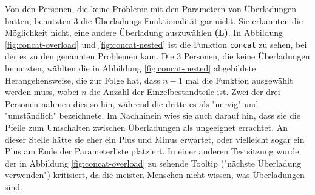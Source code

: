 Von den Personen, die keine Probleme mit den Parametern von Überladungen hatten, benutzten 3 die Überladungs-Funktionalität gar nicht. Sie erkannten die Möglichkeit nicht, eine andere Überladung auszuwählen \textbf{(L)}. In Abbildung \ref{fig:concat-overload} und \ref{fig:concat-nested} ist die Funktion \texttt{concat} zu sehen, bei der es zu den genannten Problemen kam. Die 3 Personen, die keine Überladungen benutzten, wählten die in Abbildung \ref{fig:concat-nested} abgebildete Herangehensweise, die zur Folge hat, dass $n-1$ mal die Funktion ausgewählt werden muss, wobei $n$ die Anzahl der Einzelbestandteile ist. Zwei der drei Personen nahmen dies so hin, während die dritte es als "nervig" und "umständlich" bezeichnete.  Im Nachhinein wies sie auch darauf hin, dass sie die Pfeile zum Umschalten zwischen Überladungen als ungeeignet errachtet. An dieser Stelle hätte sie eher ein Plus und Minus erwartet, oder vielleicht sogar ein Plus am Ende der Parameterliste platziert. In einer anderen Testsitzung wurde der in Abbildung \ref{fig:concat-overload} zu sehende Tooltip ("nächste Überladung verwenden") kritisiert, da die meisten Menschen nicht wissen, was Überladungen sind. 

